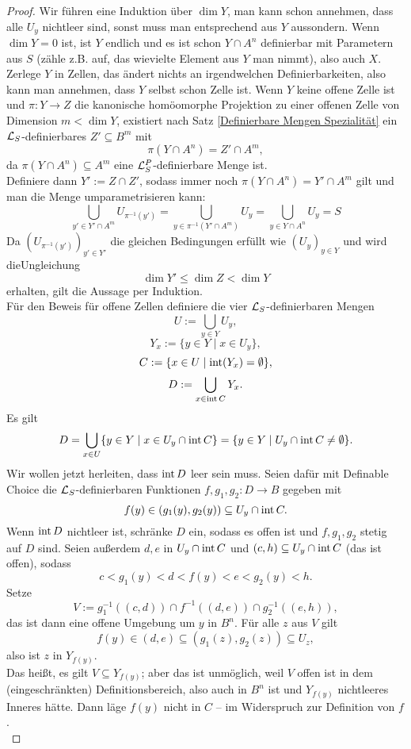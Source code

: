 \begin{proof}
	Wir führen eine Induktion über $\dim Y$, man kann schon annehmen, dass alle $U_y$ nichtleer sind, sonst muss man entsprechend aus $Y$ aussondern. Wenn $\dim Y=0$ ist, ist $Y$ endlich und es ist schon $Y\cap A^n$ definierbar mit Parametern aus $S$ (zähle z.B. auf, das wievielte Element aus $Y$ man nimmt), also auch $X$.\\
	Zerlege $Y$ in Zellen, das ändert nichts an irgendwelchen Definierbarkeiten, also kann man annehmen, dass $Y$ selbst schon Zelle ist. Wenn $Y$ keine offene Zelle ist und ${\pi:Y\rightarrow Z}$ die kanonische homöomorphe Projektion zu einer offenen Zelle von Dimension $m<\dim Y$, existiert nach Satz \ref{Definierbare Mengen Spezialität} ein $\mathcal{L}_S$-definierbares $Z'\subseteq B^m$ mit $$\pi(Y\cap A^n)=Z'\cap A^m,$$ da $\pi(Y\cap A^n)\subseteq A^m$ eine $\mathcal{L}^P_S$-definierbare Menge ist.\\
	Definiere dann $Y':=Z\cap Z'$, sodass immer noch $\pi(Y\cap A^n)=Y'\cap A^m$ gilt und man die Menge umparametrisieren kann:
	$$\bigcup\limits_{y'\in Y'\cap A^m}U_{\pi^{-1}(y')}=\bigcup\limits_{y\in\pi^{-1}(Y'\cap A^m)}U_y=\bigcup\limits_{y\in Y\cap A^n}U_y=S$$
	Da $(U_{\pi^{-1}(y')})_{y'\in Y'}$ die gleichen Bedingungen erfüllt wie $(U_y)_{y\in Y}$ und wird die\linebreak Ungleichung $$\dim Y'\leq\dim Z<\dim Y$$ erhalten, gilt die Aussage per Induktion.\\
	Für den Beweis für offene Zellen definiere die vier $\mathcal{L}_S$-definierbaren Mengen $$U:=\bigcup\limits_{y\in Y}U_y,$$ $$Y_x:=\{y\in Y\mid x\in U_y\},$$ $$C:=\{x\in U\mid\operatorname{int}(Y_x)=\emptyset\},$$ $$D:=\bigcup\limits_{x\in\operatorname{int} C}Y_x.$$
	Es gilt $$D=\bigcup\limits_{x\in U}\{y\in Y\mid x\in U_y\cap\operatorname{int} C\}=\{y\in Y\mid U_y\cap\operatorname{int} C\neq\emptyset\}.$$
	Wir wollen jetzt herleiten, dass $\operatorname{int} D$ leer sein muss. Seien dafür mit Definable Choice die $\mathcal{L}_S$-definierbaren Funktionen $f,g_1,g_2:D\rightarrow B$ gegeben mit $$f(y)\in(g_1(y),g_2(y))\subseteq U_y\cap\operatorname{int} C.$$
	Wenn $\operatorname{int} D$ nichtleer ist, schränke $D$ ein, sodass es offen ist und $f,g_1,g_2$ stetig auf $D$ sind. Seien außerdem $d,e$ in $U_y\cap\operatorname{int} C$ und $(c,h)\subseteq U_y\cap\operatorname{int} C$ (das ist offen), sodass $$c<g_1(y)<d<f(y)<e<g_2(y)<h.$$ Setze $$V:=g_1^{-1}((c,d))\cap f^{-1}((d,e))\cap g_2^{-1}((e,h)),$$ das ist dann eine offene Umgebung um $y$ in $B^n$.\newpage
	Für alle $z$ aus $V$ gilt $$f(y)\in(d,e)\subseteq(g_1(z),g_2(z))\subseteq U_z,$$ also ist $z$ in $Y_{f(y)}$.\\
	Das heißt, es gilt $V\subseteq Y_{f(y)}$; aber das ist unmöglich, weil $V$ offen ist in dem (eingeschränkten) Definitionsbereich, also auch in $B^n$ ist und $Y_{f(y)}$ nichtleeres Inneres hätte. Dann läge $f(y)$ nicht in $C$ \--- im Widerspruch zur Definition von $f$.\\

\end{proof}
